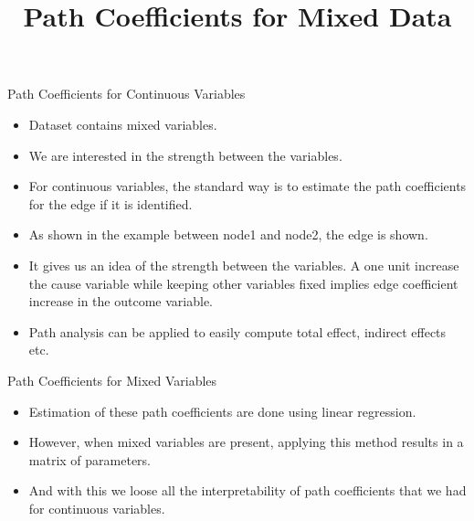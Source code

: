 \documentclass{beamer}
\begin{document}
\title[]{Path Coefficients for Mixed Data}
\author{}
\date{}

\maketitle

\begin{frame}{Path Coefficients for Continuous Variables}
	\begin{itemize}
		\item Dataset contains mixed variables.
		\item We are interested in the strength between the variables.
		\item For continuous variables, the standard way is to estimate the path coefficients for the edge if it is identified.
		\item As shown in the example between node1 and node2, the edge 
			is shown.
		\item It gives us an idea of the strength between the variables. A one
			unit increase the cause variable while keeping other variables 
			fixed implies edge coefficient increase in the outcome variable.
		\item Path analysis can be applied to easily compute total effect, 
			indirect effects etc.
	\end{itemize}
\end{frame}

\begin{frame}{Path Coefficients for Mixed Variables}
	\begin{itemize}
		\item Estimation of these path coefficients are done using linear 
			regression.
		\item However, when mixed variables are present, applying this 
			method results in a matrix of parameters.
		\item And with this we loose all the interpretability of path
			coefficients that we had for continuous variables.
	\end{itemize}
\end{frame}
\end{document}
